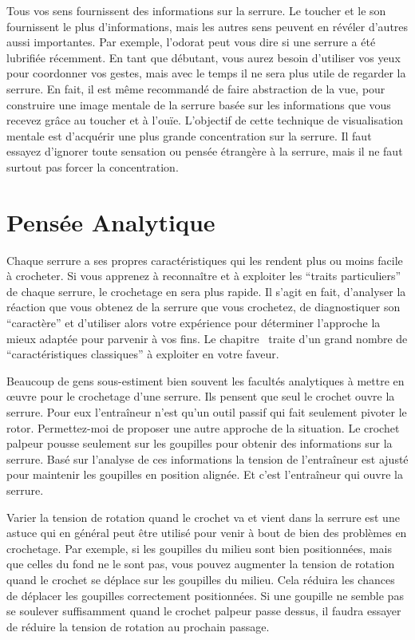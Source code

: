 \documentclass[a4paper,french,11pt,twoside]{report}
\begin{document}
Tous vos sens fournissent des informations sur la serrure. Le toucher et le son fournissent le plus d'informations, mais les autres sens peuvent en révéler d'autres aussi importantes. Par exemple, l'odorat peut vous dire si une serrure a été lubrifiée récemment. En tant que débutant, vous aurez besoin d'utiliser vos yeux pour coordonner vos gestes, mais avec le temps il ne sera plus utile de regarder la serrure. En fait, il est même recommandé de faire abstraction de la vue, pour construire une image mentale de la serrure basée sur les informations que vous recevez grâce au toucher et à l'ouïe. L'objectif de cette technique de visualisation mentale est d'acquérir une plus grande concentration sur la serrure. Il faut essayez d'ignorer toute sensation ou pensée étrangère à la serrure, mais il ne faut surtout pas forcer la concentration.

\section{Pensée Analytique}

Chaque serrure a ses propres caractéristiques qui les rendent plus ou moins facile à crocheter. Si vous apprenez à reconnaître et à exploiter les \enquote{traits particuliers} de chaque serrure, le crochetage en sera plus rapide. Il s'agit en fait, d'analyser la réaction que vous obtenez de la serrure que vous crochetez, de diagnostiquer son \enquote{caractère} et d'utiliser alors votre expérience pour déterminer l'approche la mieux adaptée pour parvenir à vos fins. Le chapitre~ traite d'un grand nombre de \enquote{caractéristiques  classiques} à exploiter en votre faveur.

Beaucoup de gens sous-estiment bien souvent les facultés analytiques à mettre en œuvre pour le crochetage d'une serrure. Ils pensent que seul le crochet ouvre la serrure. Pour eux l'entraîneur n'est qu'un outil passif qui fait seulement pivoter le rotor. Permettez-moi de proposer une autre approche de la situation. Le crochet palpeur pousse seulement sur les goupilles pour obtenir des informations sur la serrure. Basé sur l'analyse de ces informations la tension de l'entraîneur est ajusté pour maintenir les goupilles en position alignée. Et c'est l'entraîneur qui ouvre la serrure.

Varier la tension de rotation quand le crochet va et vient dans la serrure est une astuce qui en général peut être utilisé pour venir à bout de bien des problèmes en crochetage. Par exemple, si les goupilles du milieu sont bien positionnées, mais que celles du fond ne le sont pas, vous pouvez augmenter la tension de rotation quand le crochet se déplace sur les goupilles du milieu. Cela réduira les chances de déplacer les goupilles correctement positionnées. Si une goupille ne semble pas se soulever suffisamment quand le crochet palpeur passe dessus, il faudra essayer de réduire la tension de rotation au prochain passage.
\end{document}
